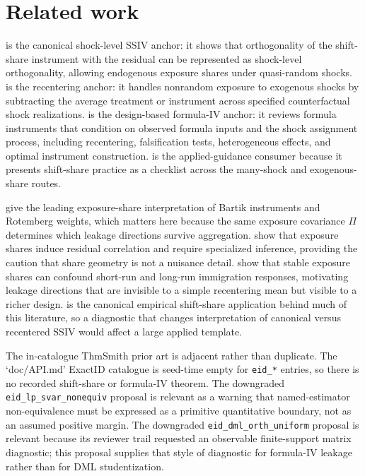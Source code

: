 \documentclass[11pt]{article}
\theoremstyle{definition}
\theoremstyle{plain}
\theoremstyle{remark}
\begin{document}
\section{Related work}
\citet{BorusyakHullJaravel2022REStud} is the canonical shock-level SSIV anchor: it shows that orthogonality of the shift-share instrument with the residual can be represented as shock-level orthogonality, allowing endogenous exposure shares under quasi-random shocks.  \citet{BorusyakHull2023Econometrica} is the recentering anchor: it handles nonrandom exposure to exogenous shocks by subtracting the average treatment or instrument across specified counterfactual shock realizations.  \citet{BorusyakHullJaravel2025ECTJ} is the design-based formula-IV anchor: it reviews formula instruments that condition on observed formula inputs and the shock assignment process, including recentering, falsification tests, heterogeneous effects, and optimal instrument construction.  \citet{BorusyakHullJaravel2025JEP} is the applied-guidance consumer because it presents shift-share practice as a checklist across the many-shock and exogenous-share routes.

\citet{GoldsmithPinkhamSorkinSwift2020AER} give the leading exposure-share interpretation of Bartik instruments and Rotemberg weights, which matters here because the same exposure covariance \(\Pi\) determines which leakage directions survive aggregation.  \citet{AdaoKolesarMorales2019QJE} show that exposure shares induce residual correlation and require specialized inference, providing the caution that share geometry is not a nuisance detail.  \citet{JaegerRuistStuhler2018NBER} show that stable exposure shares can confound short-run and long-run immigration responses, motivating leakage directions that are invisible to a simple recentering mean but visible to a richer design.  \citet{AutorDornHanson2013AER} is the canonical empirical shift-share application behind much of this literature, so a diagnostic that changes interpretation of canonical versus recentered SSIV would affect a large applied template.

The in-catalogue ThmSmith prior art is adjacent rather than duplicate.  The `doc/API.md' ExactID catalogue is seed-time empty for \texttt{eid\_*} entries, so there is no recorded shift-share or formula-IV theorem.  The downgraded \texttt{eid\_lp\_svar\_nonequiv} proposal is relevant as a warning that named-estimator non-equivalence must be expressed as a primitive quantitative boundary, not as an assumed positive margin.  The downgraded \texttt{eid\_dml\_orth\_uniform} proposal is relevant because its reviewer trail requested an observable finite-support matrix diagnostic; this proposal supplies that style of diagnostic for formula-IV leakage rather than for DML studentization.
\end{document}
